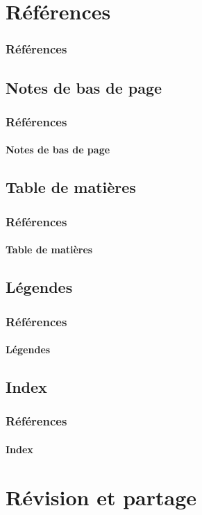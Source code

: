 \documentclass[xcolor=table]{beamer}
\begin{document}
\section{Références}

\begin{frame}
\frametitle{Références}

\end{frame}

\subsection{Notes de bas de page}

\begin{frame}
\frametitle{Références}
\framesubtitle{Notes de bas de page}

\end{frame}

\subsection{Table de matières}

\begin{frame}
\frametitle{Références}
\framesubtitle{Table de matières}

\end{frame}

\subsection{Légendes}

\begin{frame}
\frametitle{Références}
\framesubtitle{Légendes}

\end{frame}

\subsection{Index}

\begin{frame}
\frametitle{Références}
\framesubtitle{Index}

\end{frame}

\section{Révision et partage}
\end{document}

